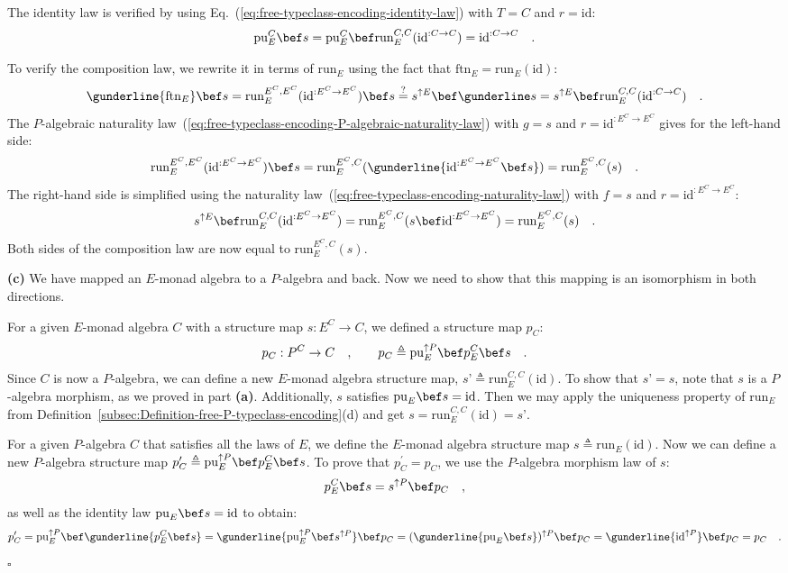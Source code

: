 The identity law is verified by using Eq.~(\ref{eq:free-typeclass-encoding-identity-law})
with $T=C$ and $r=\text{id}$:
\[
\text{pu}_{E}^{C}\bef s=\text{pu}_{E}^{C}\bef\text{run}_{E}^{C,C}(\text{id}^{:C\rightarrow C})=\text{id}^{:C\rightarrow C}\quad.
\]

To verify the composition law, we rewrite it in terms of $\text{run}_{E}$
using the fact that $\text{ftn}_{E}=\text{run}_{E}(\text{id})$:
\[
\gunderline{\text{ftn}_{E}}\bef s=\text{run}_{E}^{E^{C},E^{C}}(\text{id}^{:E^{C}\rightarrow E^{C}})\bef s\overset{?}{=}s^{\uparrow E}\bef\gunderline s=s^{\uparrow E}\bef\text{run}_{E}^{C,C}(\text{id}^{:C\rightarrow C})\quad.
\]
The $P$-algebraic naturality law~(\ref{eq:free-typeclass-encoding-P-algebraic-naturality-law})
with $g=s$ and $r=\text{id}^{:E^{C}\rightarrow E^{C}}$ gives for
the left-hand side:
\[
\text{run}_{E}^{E^{C},E^{C}}(\text{id}^{:E^{C}\rightarrow E^{C}})\bef s=\text{run}_{E}^{E^{C},C}(\gunderline{\text{id}^{:E^{C}\rightarrow E^{C}}\bef s})=\text{run}_{E}^{E^{C},C}(s)\quad.
\]
The right-hand side is simplified using the naturality law~(\ref{eq:free-typeclass-encoding-naturality-law})
with $f=s$ and $r=\text{id}^{:E^{C}\rightarrow E^{C}}$:
\[
s^{\uparrow E}\bef\text{run}_{E}^{C,C}(\text{id}^{:E^{C}\rightarrow E^{C}})=\text{run}_{E}^{E^{C},C}(s\bef\text{id}^{:E^{C}\rightarrow E^{C}})=\text{run}_{E}^{E^{C},C}(s)\quad.
\]
Both sides of the composition law are now equal to $\text{run}_{E}^{E^{C},C}(s)$.

\textbf{(c)} We have mapped an $E$-monad algebra to a $P$-algebra
and back. Now we need to show that this mapping is an isomorphism
in both directions.

For a given $E$-monad algebra $C$ with a structure map $s:E^{C}\rightarrow C$,
we defined a structure map $p_{C}$:
\[
p_{C}:P^{C}\rightarrow C\quad,\quad\quad p_{C}\triangleq\text{pu}_{E}^{\uparrow P}\bef p_{E}^{C}\bef s\quad.
\]
Since $C$ is now a $P$-algebra, we can define a new $E$-monad algebra
structure map, $s\textsf{'}\triangleq\text{run}_{E}^{C,C}(\text{id})$. To
show that $s\textsf{'}=s$, note that $s$ is a $P$-algebra morphism, as we
proved in part \textbf{(a)}. Additionally, $s$ satisfies $\text{pu}_{E}\bef s=\text{id}$.
Then we may apply the uniqueness property of $\text{run}_{E}$ from
Definition~\ref{subsec:Definition-free-P-typeclass-encoding}(d)
and get $s=\text{run}_{E}^{C,C}(\text{id})=s\textsf{'}$.

For a given $P$-algebra $C$ that satisfies all the laws of $E$,
we define the $E$-monad algebra structure map $s\triangleq\text{run}_{E}(\text{id})$.
Now we can define a new $P$-algebra structure map $p_{C}^{\prime}\triangleq\text{pu}_{E}^{\uparrow P}\bef p_{E}^{C}\bef s$.
To prove that $p_{C}^{\prime}=p_{C}$, we use the $P$-algebra morphism
law of $s$:
\[
p_{E}^{C}\bef s=s^{\uparrow P}\bef p_{C}\quad,
\]
as well as the identity law $\text{pu}_{E}\bef s=\text{id}$ to obtain:
\[
p_{C}^{\prime}=\text{pu}_{E}^{\uparrow P}\bef\gunderline{p_{E}^{C}\bef s}=\gunderline{\text{pu}_{E}^{\uparrow P}\bef s^{\uparrow P}}\bef p_{C}=(\gunderline{\text{pu}_{E}\bef s})^{\uparrow P}\bef p_{C}=\gunderline{\text{id}^{\uparrow P}}\bef p_{C}=p_{C}\quad.
\]
$\square$

